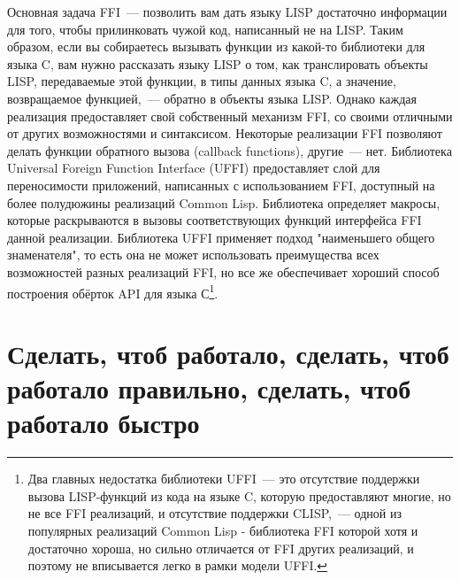Основная задача FFI~--- позволить вам дать языку LISP достаточно информации для того, чтобы
прилинковать чужой код, написанный не на LISP. Таким образом, если вы собираетесь вызывать
функции из какой-то библиотеки для языка C, вам нужно рассказать языку LISP о том, как
транслировать объекты LISP, передаваемые этой функции, в типы данных языка C, а значение,
возвращаемое функцией,~--- обратно в объекты языка LISP. Однако каждая реализация
предоставляет свой собственный механизм FFI, со своими отличными от других возможностями и
синтаксисом. Некоторые реализации FFI позволяют делать функции обратного вызова (callback
functions), другие~--- нет. Библиотека Universal Foreign Function Interface (UFFI)
предоставляет слой для переносимости приложений, написанных с использованием FFI,
доступный на более полудюжины реализаций Common Lisp. Библиотека определяет макросы,
которые раскрываются в вызовы соответствующих функций интерфейса FFI данной
реализации. Библиотека UFFI применяет подход "наименьшего общего знаменателя", то есть она
не может использовать преимущества всех возможностей разных реализаций FFI, но все же
обеспечивает хороший способ построения обёрток API для языка С\footnote{Два главных
  недостатка библиотеки UFFI~--- это отсутствие поддержки вызова LISP-функций из кода на
  языке C, которую предоставляют многие, но не все FFI реализаций, и отсутствие поддержки
  CLISP,~--- одной из популярных реализаций Common Lisp - библиотека FFI которой хотя и
  достаточно хороша, но сильно отличается от FFI других реализаций, и поэтому не
  вписывается легко в рамки модели UFFI.}.

\section{Сделать, чтоб работало, сделать, чтоб работало правильно, сделать, чтоб работало быстро}

